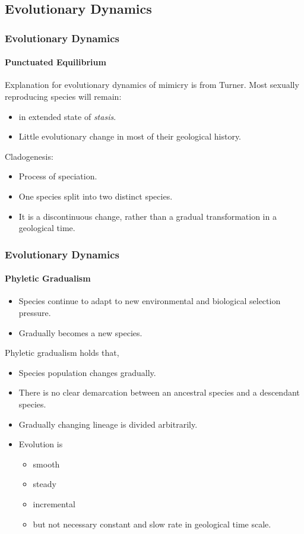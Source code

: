 \subsection{Evolutionary Dynamics}

\frame
{
	\frametitle{Evolutionary Dynamics}
	\framesubtitle{Punctuated Equilibrium}

	Explanation for evolutionary dynamics of mimicry is from Turner. Most sexually reproducing species will remain:
	\begin{itemize}
		\item in extended state of \textit{stasis}.
		\item Little evolutionary change in most of their geological history.
	\end{itemize}
	
	Cladogenesis:
	\begin{itemize}
		\item Process of speciation.
		\item One species split into two distinct species.
		\item It is a discontinuous change, rather than a gradual transformation in a geological time.
	\end{itemize}
}

\frame
{
	\frametitle{Evolutionary Dynamics}
	\framesubtitle{Phyletic Gradualism}

	\begin{itemize}
		\item Species continue to adapt to new environmental and biological selection pressure.
		\item Gradually becomes a new species.
	\end{itemize}
	
	Phyletic gradualism holds that,
	\begin{itemize}
		\item Species population changes gradually.
		\item There is no clear demarcation between an ancestral species and a descendant species.
		\item Gradually changing lineage is divided arbitrarily.
		\item Evolution is 
			\begin{itemize}
				\item smooth
				\item steady
				\item incremental
				\item but not necessary constant and slow rate in geological time scale.
			\end{itemize}
	\end{itemize}
}

